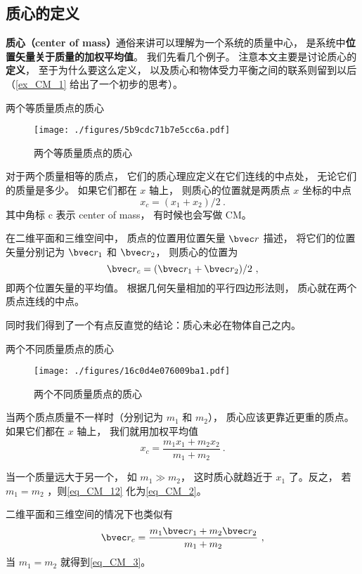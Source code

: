 

\subsection{质心的定义}
\textbf{质心（center of mass）}通俗来讲可以理解为一个系统的质量中心， 是系统中\textbf{位置矢量关于质量的加权平均值}。 我们先看几个例子。 注意本文主要是讨论质心的\textbf{定义}， 至于为什么要这么定义， 以及质心和物体受力平衡之间的联系则留到以后（\autoref{ex_CM_1} 给出了一个初步的思考）。

\begin{example}{两个等质量质点的质心}

\begin{figure}[ht]
\centering
\texttt{[image: ./figures/5b9cdc71b7e5cc6a.pdf]}
\caption{两个等质量质点的质心} \label{fig_CM_4}
\end{figure}
对于两个质量相等的质点， 它们的质心理应定义在它们连线的中点处， 无论它们的质量是多少。 如果它们都在 $x$ 轴上， 则质心的位置就是两质点 $x$ 坐标的中点
\begin{equation}\label{eq_CM_2}
x_c = (x_1 + x_2)/2~.
\end{equation}
其中角标 c 表示 center of mass， 有时候也会写做 CM。

在二维平面和三维空间中， 质点的位置用位置矢量 $\bvec r$ 描述， 将它们的位置矢量分别记为 $\bvec r_1$ 和 $\bvec r_2$， 则质心的位置为
\begin{equation}\label{eq_CM_3}
\bvec r_c = (\bvec r_1 + \bvec r_2)/2~,
\end{equation}
即两个位置矢量的平均值。 根据几何矢量相加的平行四边形法则， 质心就在两个质点连线的中点。

同时我们得到了一个有点反直觉的结论：质心未必在物体自己之内。
\end{example}

\begin{example}{两个不同质量质点的质心}
\begin{figure}[ht]
\centering
\texttt{[image: ./figures/16c0d4e076009ba1.pdf]}
\caption{两个不同质量质点的质心} \label{fig_CM_5}
\end{figure}
当两个质点质量不一样时（分别记为 $m_1$ 和 $m_2$）， 质心应该更靠近更重的质点。 如果它们都在 $x$ 轴上， 我们就用加权平均值
\begin{equation}\label{eq_CM_12}
x_c = \frac{m_1 x_1 + m_2 x_2}{m_1 + m_2}~.
\end{equation}

当一个质量远大于另一个， 如 $m_1 \gg m_2$， 这时质心就趋近于 $x_1$ 了。反之， 若$m_1 = m_2$ ，则\autoref{eq_CM_12} 化为\autoref{eq_CM_2}。

二维平面和三维空间的情况下也类似有
\begin{equation}\label{eq_CM_5}
\bvec r_c = \frac{m_1 \bvec r_1 + m_2 \bvec r_2}{m_1 + m_2}~,
\end{equation}
当 $m_1 = m_2$ 就得到\autoref{eq_CM_3}。
\end{example}

